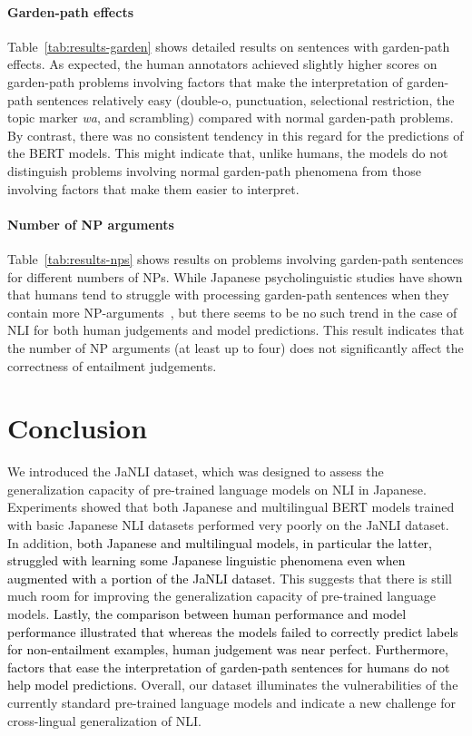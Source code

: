 \documentclass[11pt]{article}
\newcommand{\todo}[1]{\textcolor{black}{#1}}
\begin{document}
\paragraph{Garden-path effects}
Table~\ref{tab:results-garden} shows detailed results on
sentences with garden-path effects.
As expected, the human annotators achieved slightly higher scores on garden-path problems involving factors that make the interpretation of garden-path sentences relatively easy (double-o, punctuation, selectional restriction, the topic marker \textit{wa}, and scrambling) compared with normal garden-path problems.
By contrast, there was no consistent tendency in this regard for the predictions of the BERT models.
This might indicate that, unlike humans, the models do not distinguish problems involving normal garden-path phenomena from those involving factors that make them easier to interpret.

\paragraph{Number of NP arguments}
Table~\ref{tab:results-nps} shows results on problems involving garden-path sentences for different numbers of NPs.
While Japanese psycholinguistic studies have shown that humans tend to struggle with processing garden-path sentences when 
they contain more NP-arguments~\cite{inoue1990b},
but there seems to be no such trend in the case of NLI
for both human judgements and model predictions.
This result indicates that
the number of NP arguments (at least up to four)
does not significantly affect 
the correctness of entailment judgements.

\section{Conclusion}
\label{sec:conclusion}
We introduced the JaNLI dataset, which was
designed to assess the generalization capacity of pre-trained language models
on NLI in Japanese.
Experiments showed that both Japanese and multilingual BERT models trained with basic Japanese NLI datasets performed very poorly on the JaNLI dataset.
In addition, \todo{both Japanese and multilingual models, in particular the latter, struggled with learning some Japanese linguistic phenomena even when augmented with a portion of the JaNLI dataset.}
This suggests that there is still much room for improving the generalization capacity of pre-trained language models.
\todo{Lastly, the comparison between human performance and model performance illustrated that whereas the models failed to correctly predict labels for non-entailment examples, human judgement was near perfect. 
Furthermore, factors that ease the interpretation of garden-path sentences for humans do not help model predictions.}
Overall, our dataset illuminates the vulnerabilities of
the currently standard pre-trained language models
and indicate a new challenge for cross-lingual generalization of NLI.
\end{document}
